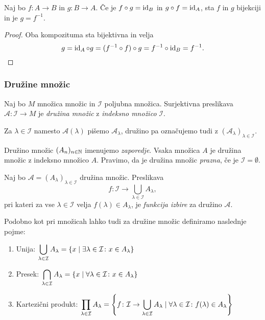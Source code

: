 \documentclass[12pt, a4paper]{article}
\begin{document}
\obvs

\begin{izrek}
Naj bo $f\colon A\to B$ in $g\colon B\to A$. Če je $f\circ g=\operatorname{id}_B$ in $g\circ f=\operatorname{id}_A$, sta $f$ in $g$ bijekciji in je $g=f^{-1}$.
\end{izrek}

\begin{proof}
Oba kompozituma sta bijektivna in velja
\[
g=\operatorname{id}_A\circ g=(f^{-1}\circ f)\circ g=f^{-1}\circ\operatorname{id}_B=f^{-1}.\qedhere
\]
\end{proof}

\newpage

\subsubsection{Družine množic}

\begin{okvir}
\begin{definicija}
Naj bo $M$ množica množic in $\mathcal{I}$ poljubna množica. Surjektivna preslikava $\mathcal{A}\colon\mathcal{I}\to M$ je \emph{družina množic} z \emph{indeksno množico} $\mathcal{I}$.
\end{definicija}
\end{okvir}

Za $\lambda\in\mathcal{I}$ namesto $\mathcal{A}(\lambda)$ pišemo $\mathcal{A}_{\lambda}$, družino pa označujemo tudi z $(\mathcal{A}_{\lambda})_{\lambda\in\mathcal{I}}$.

Družino množic $(A_n)_{n\in\mathbb{N}}$ imenujemo \emph{zaporedje}. Vsaka množica $A$ je družina množic z indeksno množico $A$. Pravimo, da je družina množic \emph{prazna}, če je $\mathcal{I}=\emptyset$.

\begin{definicija}
Naj bo $\mathcal{A}=(A_{\lambda})_{\lambda\in\mathcal{I}}$ družina množic. Preslikava
\[
f\colon\mathcal{I}\to\bigcup_{\lambda\in\mathcal{I}}A_{\lambda},
\]
pri kateri za vse $\lambda\in\mathcal{I}$ velja $f(\lambda)\in A_{\lambda}$, je \emph{funkcija izbire} za družino $\mathcal{A}$.
\end{definicija}

\begin{definicija}
Podobno kot pri množicah lahko tudi za družine množic definiramo naslednje pojme:

\begin{enumerate}
\item Unija: $\displaystyle\bigcup_{\lambda\in\mathcal{I}} A_{\lambda}=\left\{x\mid \exists\lambda\in\mathcal{I}\colon x\in A_{\lambda}\right\}$
\item Presek: $\displaystyle\bigcap_{\lambda\in\mathcal{I}} A_{\lambda}=\left\{x\mid \forall\lambda\in\mathcal{I}\colon x\in A_{\lambda}\right\}$
\item Kartezični produkt: $\displaystyle\prod_{\lambda\in\mathcal{I}} A_{\lambda}=\left\{f\colon\mathcal{I}\to\bigcup_{\lambda\in\mathcal{I}}A_{\lambda}\mid \forall\lambda\in\mathcal{I}\colon f(\lambda)\in A_{\lambda}\right\}$
\end{enumerate}
\end{definicija}
\end{document}
